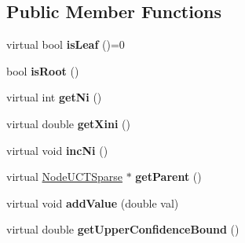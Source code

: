 \subsection*{Public Member Functions}
\begin{DoxyCompactItemize}
\item 
\hypertarget{classMultiBoost_1_1NodeUCTSparse_a1c4ca3766d6175ddf11869c6e367be66}{virtual bool {\bfseries is\-Leaf} ()=0}\label{classMultiBoost_1_1NodeUCTSparse_a1c4ca3766d6175ddf11869c6e367be66}

\item 
\hypertarget{classMultiBoost_1_1NodeUCTSparse_ae0cd04afa5f85c126ac15606016241f4}{bool {\bfseries is\-Root} ()}\label{classMultiBoost_1_1NodeUCTSparse_ae0cd04afa5f85c126ac15606016241f4}

\item 
\hypertarget{classMultiBoost_1_1NodeUCTSparse_a4c23edb3d1b2b6daa794afab117342d2}{virtual int {\bfseries get\-Ni} ()}\label{classMultiBoost_1_1NodeUCTSparse_a4c23edb3d1b2b6daa794afab117342d2}

\item 
\hypertarget{classMultiBoost_1_1NodeUCTSparse_aa813626843e28a88a7596de6b8c2f02c}{virtual double {\bfseries get\-Xini} ()}\label{classMultiBoost_1_1NodeUCTSparse_aa813626843e28a88a7596de6b8c2f02c}

\item 
\hypertarget{classMultiBoost_1_1NodeUCTSparse_aa52c60fcdc6a4e94cc7af076948ba513}{virtual void {\bfseries inc\-Ni} ()}\label{classMultiBoost_1_1NodeUCTSparse_aa52c60fcdc6a4e94cc7af076948ba513}

\item 
\hypertarget{classMultiBoost_1_1NodeUCTSparse_ac5a2400bc3006db0059e5e6c65dd2aad}{virtual \hyperlink{classMultiBoost_1_1NodeUCTSparse}{Node\-U\-C\-T\-Sparse} $\ast$ {\bfseries get\-Parent} ()}\label{classMultiBoost_1_1NodeUCTSparse_ac5a2400bc3006db0059e5e6c65dd2aad}

\item 
\hypertarget{classMultiBoost_1_1NodeUCTSparse_a4ee398d1d1f7a4710a65d83b69c92c59}{virtual void {\bfseries add\-Value} (double val)}\label{classMultiBoost_1_1NodeUCTSparse_a4ee398d1d1f7a4710a65d83b69c92c59}

\item 
\hypertarget{classMultiBoost_1_1NodeUCTSparse_a4d12a61497753ed8f905fe1a6ede51fd}{virtual double {\bfseries get\-Upper\-Confidence\-Bound} ()}\label{classMultiBoost_1_1NodeUCTSparse_a4d12a61497753ed8f905fe1a6ede51fd}


\end{DoxyCompactItemize}
